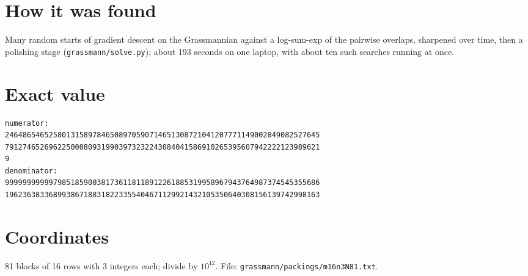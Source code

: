 \documentclass[11pt,a4paper]{article}
\begin{document}
\section{How it was found}
Many random starts of gradient descent on the Grassmannian against a log-sum-exp of the pairwise overlaps, sharpened over time, then a polishing stage (\texttt{grassmann/solve.py}); about 193 seconds on one laptop, with about ten such searches running at once.


\appendix
\section{Exact value}
{\small
\begin{verbatim}
numerator:
246486546525801315897846508970590714651308721041207771149002849082527645
791274652696225000809319903973232243084041586910265395607942222123989621
9
denominator:
999999999997985185900381736118118912261885319958967943764987374545355686
196236383368993867188318223355404671129921432105350640308156139742998163
\end{verbatim}}

\section{Coordinates}
81 blocks of 16 rows with 3 integers each; divide by $10^{12}$. File: \texttt{grassmann/packings/m16n3N81.txt}.
{\tiny
\begin{multicols}{3}
\end{multicols}}
\end{document}
